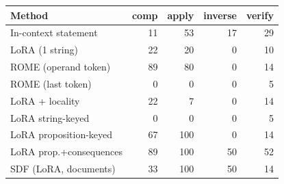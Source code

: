 \begin{tabular}{lrrrr}
\toprule
Method & comp & apply & inverse & verify \\
\midrule
In-context statement & 11 & 53 & 17 & 29 \\
LoRA (1 string) & 22 & 20 & 0 & 10 \\
ROME (operand token) & 89 & 80 & 0 & 14 \\
ROME (last token) & 0 & 0 & 0 & 5 \\
LoRA + locality & 22 & 7 & 0 & 14 \\
LoRA string-keyed & 0 & 0 & 0 & 5 \\
LoRA proposition-keyed & 67 & 100 & 0 & 14 \\
LoRA prop.+consequences & 89 & 100 & 50 & 52 \\
SDF (LoRA, documents) & 33 & 100 & 50 & 14 \\
\bottomrule
\end{tabular}
